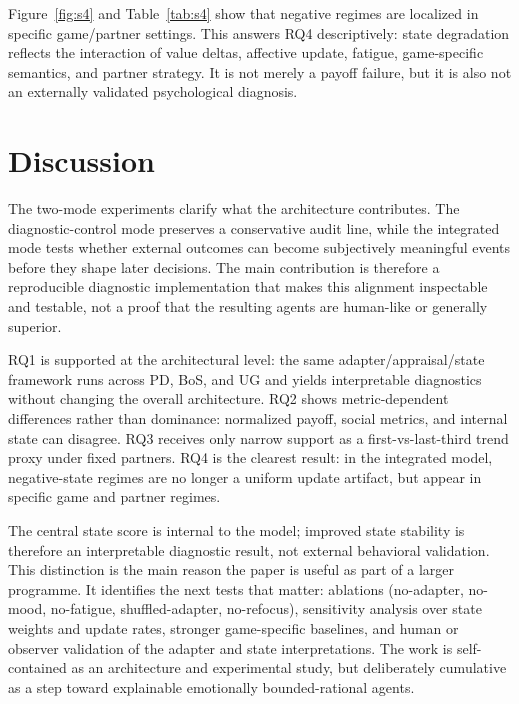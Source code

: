 \documentclass[runningheads]{llncs}
\begin{document}
Figure~\ref{fig:s4} and Table~\ref{tab:s4} show that negative regimes are localized in specific game/partner settings. This answers RQ4 descriptively: state degradation reflects the interaction of value deltas, affective update, fatigue, game-specific semantics, and partner strategy. It is not merely a payoff failure, but it is also not an externally validated psychological diagnosis.

\section{Discussion}
The two-mode experiments clarify what the architecture contributes. The diagnostic-control mode preserves a conservative audit line, while the integrated mode tests whether external outcomes can become subjectively meaningful events before they shape later decisions. The main contribution is therefore a reproducible diagnostic implementation that makes this alignment inspectable and testable, not a proof that the resulting agents are human-like or generally superior.

RQ1 is supported at the architectural level: the same adapter/appraisal/state framework runs across PD, BoS, and UG and yields interpretable diagnostics without changing the overall architecture. RQ2 shows metric-dependent differences rather than dominance: normalized payoff, social metrics, and internal state can disagree. RQ3 receives only narrow support as a first-vs-last-third trend proxy under fixed partners. RQ4 is the clearest result: in the integrated model, negative-state regimes are no longer a uniform update artifact, but appear in specific game and partner regimes.

The central state score is internal to the model; improved state stability is therefore an interpretable diagnostic result, not external behavioral validation. This distinction is the main reason the paper is useful as part of a larger programme. It identifies the next tests that matter: ablations (no-adapter, no-mood, no-fatigue, shuffled-adapter, no-refocus), sensitivity analysis over state weights and update rates, stronger game-specific baselines, and human or observer validation of the adapter and state interpretations. The work is self-contained as an architecture and experimental study, but deliberately cumulative as a step toward explainable emotionally bounded-rational agents.
\end{document}
